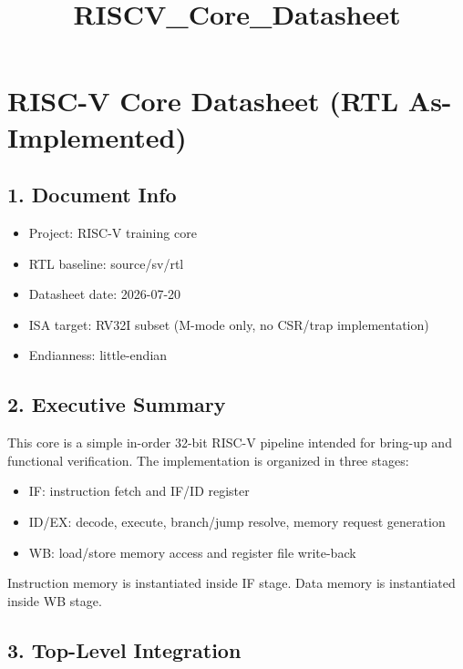 \documentclass[]{article}
\title{RISCV\_Core\_Datasheet}
\date{}
\providecommand{\tightlist}{%
  \setlength{\itemsep}{0pt}\setlength{\parskip}{0pt}}
\begin{document}
\maketitle

\hypertarget{risc-v-core-datasheet-rtl-as-implemented}{%
\section{RISC-V Core Datasheet (RTL
As-Implemented)}\label{risc-v-core-datasheet-rtl-as-implemented}}

\hypertarget{1-document-info}{%
\subsection{1. Document Info}\label{1-document-info}}

\begin{itemize}
\tightlist
\item
  Project: RISC-V training core
\item
  RTL baseline: source/sv/rtl
\item
  Datasheet date: 2026-07-20
\item
  ISA target: RV32I subset (M-mode only, no CSR/trap implementation)
\item
  Endianness: little-endian
\end{itemize}

\hypertarget{2-executive-summary}{%
\subsection{2. Executive Summary}\label{2-executive-summary}}

This core is a simple in-order 32-bit RISC-V pipeline intended for
bring-up and functional verification. The implementation is organized in
three stages:

\begin{itemize}
\tightlist
\item
  IF: instruction fetch and IF/ID register
\item
  ID/EX: decode, execute, branch/jump resolve, memory request generation
\item
  WB: load/store memory access and register file write-back
\end{itemize}

Instruction memory is instantiated inside IF stage. Data memory is
instantiated inside WB stage.

\hypertarget{3-top-level-integration}{%
\subsection{3. Top-Level Integration}\label{3-top-level-integration}}
\end{document}

